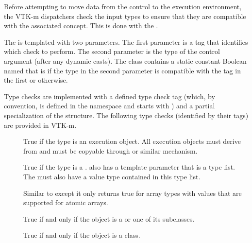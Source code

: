 
Before attempting to move data from the control to the execution
environment, the VTK-m dispatchers check the input types to ensure that
they are compatible with the associated \controlsignature concept. This is
done with the  .

The   is templated with two
parameters. The first parameter is a tag that identifies which check to
perform. The second parameter is the type of the control argument (after any
dynamic casts). The  class contains a static
constant Boolean named  that is  if the type
in the second parameter is compatible with the tag in the first or
 otherwise.

Type checks are implemented with a defined type check tag (which, by
convention, is defined in the \vtkmcontarg{} namespace and starts with
) and a partial specialization of the
 structure. The following type checks (identified by
their tags) are provided in VTK-m.

\begin{description}
\item[]
   True if the type is an execution
  object. All execution objects must derive from
   and must be copyable through
   or similar mechanism.
\item[]  True if the
  type is a .  also
  has a template parameter that is a type list. The
   must also have a value type contained in
  this type list.
\item[] 
  Similar to  except it only returns true for array types with values that are supported for atomic arrays.
\item[] 
  True if and only if the object is a  or one of its subclasses.
\item[] 
  True if and only if the object is a  class.
\end{description}

